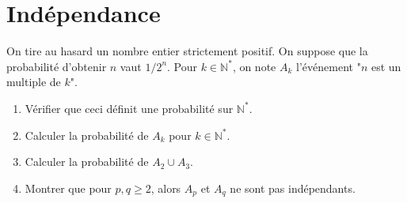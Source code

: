 \documentclass[../PolyS4.tex]{subfiles}
\begin{document}



\section{Indépendance}


On tire au hasard un nombre entier strictement positif. On suppose que la probabilité d'obtenir $n$ vaut $1/2^n$. Pour $k\in\mathbb N^*$, on note $A_k$ l'événement "$n$ est un multiple de $k$".
\begin{enumerate}
\item Vérifier que ceci définit une probabilité sur $\mathbb N^*$.
\item Calculer la probabilité de $A_k$ pour $k\in\mathbb N^*$.
\item Calculer la probabilité de $A_2\cup A_3$.
\item Montrer que pour $p,q\geq 2$, alors $A_p$ et $A_q$ ne sont pas indépendants.\\
\end{enumerate}
\end{document}
